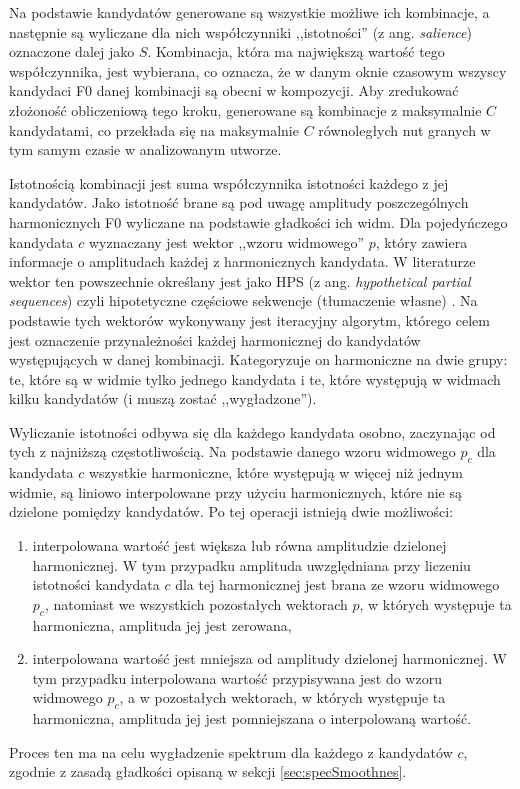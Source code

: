 \documentclass[12pt,a4paper,twoside]{mwart}
\begin{document}
Na podstawie kandydatów generowane są wszystkie możliwe ich kombinacje, a następnie są wyliczane dla nich współczynniki ,,istotności'' (z ang. \textit{salience}) oznaczone dalej jako $S$. Kombinacja, która ma największą wartość tego współczynnika, jest wybierana, co oznacza, że w danym oknie czasowym wszyscy kandydaci F0 danej kombinacji są obecni w kompozycji. Aby zredukować złożoność obliczeniową tego kroku, generowane są kombinacje z maksymalnie $C$ kandydatami, co przekłada się na maksymalnie $C$ równoległych nut granych w tym samym czasie w analizowanym utworze.

Istotnością kombinacji jest suma współczynnika istotności każdego z jej kandydatów. Jako istotność brane są pod uwagę amplitudy poszczególnych harmonicznych F0 wyliczane na podstawie gładkości ich widm. Dla pojedyńczego kandydata $c$ wyznaczany jest wektor ,,wzoru widmowego'' $p$, który zawiera informacje o amplitudach każdej z harmonicznych kandydata. W literaturze wektor ten powszechnie określany jest jako HPS (z ang. \textit{hypothetical partial sequences}) czyli hipotetyczne częściowe sekwencje (tłumaczenie własne) 
\cite[1118]{Transcription:Yeh:JointEvaluationF0:2}.
Na podstawie tych wektorów wykonywany jest iteracyjny algorytm, którego celem jest oznaczenie przynależności każdej harmonicznej do kandydatów występujących w danej kombinacji. Kategoryzuje on harmoniczne na dwie grupy: te, które są w widmie tylko jednego kandydata i te, które występują w widmach kilku kandydatów (i muszą zostać ,,wygładzone'').

Wyliczanie istotności odbywa się dla każdego kandydata osobno, zaczynając od tych z najniższą częstotliwością. Na podstawie danego wzoru widmowego $p_c$ dla kandydata $c$ wszystkie harmoniczne, które występują w więcej niż jednym widmie, są liniowo interpolowane przy użyciu harmonicznych, które nie są dzielone pomiędzy kandydatów. Po tej operacji istnieją dwie możliwości:
\begin{enumerate}
\item interpolowana wartość jest większa lub równa amplitudzie dzielonej harmonicznej. W tym przypadku amplituda uwzględniana przy liczeniu istotności kandydata $c$ dla tej harmonicznej jest brana ze wzoru widmowego $p_c$, natomiast we wszystkich pozostałych wektorach $p$, w których występuje ta harmoniczna, amplituda jej jest zerowana,
\item interpolowana wartość jest mniejsza od amplitudy dzielonej harmonicznej. W tym przypadku interpolowana wartość przypisywana jest do wzoru widmowego $p_c$, a w pozostałych wektorach, w których występuje ta harmoniczna, amplituda jej jest pomniejszana o interpolowaną wartość.
\end{enumerate}
Proces ten ma na celu wygładzenie spektrum dla każdego z kandydatów $c$, zgodnie z zasadą gładkości opisaną w sekcji \ref{sec:specSmoothnes}.
\end{document}

